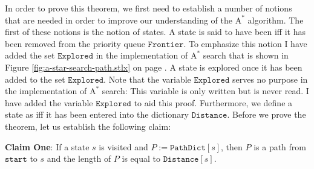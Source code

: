 \proof
In order to prove this theorem, we first need to establish a number of notions that are  needed in
order to improve our understanding of the $\textrm{A}^*$ algorithm.  The first of these notions is the notion of 
states.  A state is said to have been  iff it has been
removed from the priority queue $\texttt{Frontier}$. 
To emphasize this notion I have added the set $\texttt{Explored}$ in the implementation of $\textrm{A}^*$ search that
is shown in Figure \ref{fig:a-star-search-path.stlx} on page \pageref{fig:a-star-search-path.stlx}.  A state
is explored once it has been added to the set $\texttt{Explored}$.  Note that the variable
$\texttt{Explored}$ serves no purpose in the implementation of $\textrm{A}^*$ search:  This variable is only
written but is never read.  I have added the variable $\texttt{Explored}$ to aid this
proof.  Furthermore, we define a state as  iff it has been entered into the 
dictionary $\texttt{Distance}$.  Before we prove the theorem, let us establish the following claim:
\vspace*{0.2cm}

\noindent
\textbf{Claim One}: If a state $s$ is visited and
$P := \texttt{PathDict}[s]$, then $P$ is a path from $\texttt{start}$ to $s$ and the length of
$P$ is equal to $\texttt{Distance}[s]$.  
\vspace*{0.2cm}

